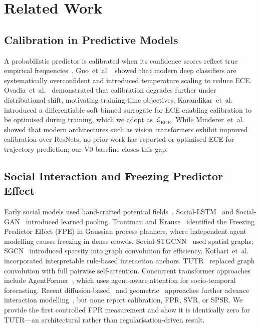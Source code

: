 \documentclass[journal]{IEEEtran}
\makeatletter
\newcommand{\etal}{et~al.\@}
\makeatother
\begin{document}
\section{Related Work}
\label{sec:related}

\subsection{Calibration in Predictive Models}

A probabilistic predictor is calibrated when its confidence scores
reflect true empirical frequencies~\cite{guo2017calibration,niculescu2005predicting}.
Guo~\etal~\cite{guo2017calibration} showed that modern deep classifiers
are systematically overconfident and introduced temperature scaling to
reduce ECE.
Ovadia~\etal~\cite{ovadia2019can} demonstrated that calibration degrades
further under distributional shift, motivating training-time objectives.
Karandikar~\etal~\cite{karandikar2021soft} introduced a differentiable
soft-binned surrogate for ECE enabling calibration to be optimised
during training, which we adopt as \(\mathcal{L}_{\text{ECE}}\).
While Minderer~\etal~\cite{minderer2021revisiting} showed that modern architectures such as vision transformers exhibit improved calibration over ResNets, no prior work has reported or optimised ECE for trajectory prediction; our V0 baseline closes this gap.

\subsection{Social Interaction and Freezing Predictor Effect}

Early social models used hand-crafted potential
fields~\cite{helbing1995social}.
Social-LSTM~\cite{alahi2016social} and
Social-GAN~\cite{gupta2018social} introduced learned pooling.
Trautman and Krause~\cite{trautman2010unfreezing} identified the
Freezing Predictor Effect (FPE) in Gaussian process planners, where
independent agent modelling causes freezing in dense crowds.
Social-STGCNN~\cite{mohamed2020social} used spatial graphs; SGCN~\cite{shi2021sgcn} introduced sparsity into graph convolution for efficiency. Kothari~\etal~\cite{kothari2021interpretable} incorporated interpretable rule-based interaction anchors. TUTR~\cite{shi2023tutr} replaced graph convolution with full pairwise self-attention.
Concurrent transformer approaches include AgentFormer~\cite{yuan2021agentformer}, which uses agent-aware attention for socio-temporal forecasting. Recent diffusion-based~\cite{liu2024diftraj} and geometric~\cite{wong2024socialcircle} approaches further advance interaction modelling~\cite{bae2024singular}, but none report calibration, FPR, SVR, or SPSR.
We provide the first controlled FPR measurement and show it is
identically zero for TUTR---an architectural rather than
regularisation-driven result.
\end{document}

